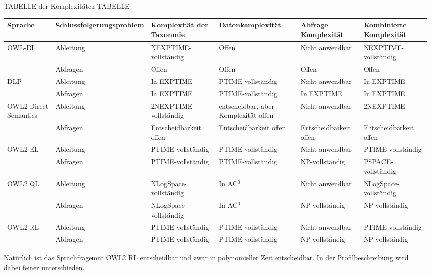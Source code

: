 TABELLE der Komplexitäten TABELLE
\begin{table}
	
	\begin{tabular}{|m{1.4cm}|p{2cm}|p{2cm}|p{2cm}|p{2cm}|p{2cm}|}
	\hline
	Sprache & Schlussfolger\-ungs\-problem & Komplexität der Taxonmie & Daten\-komplexität & Abfrage Komplexität & Kombinierte Komplexität \\
	\hline
	\hline
	\multirow{2}{*}{OWL-DL} & Ableitung & NEXPTIME-vollständig & Offen & Nicht anwendbar & NEXPTIME-vollständig \\ \cline{2-6}
		& Abfragen & Offen & Offen & Offen & Offen \\
	\hline
	\multirow{2}{*}{DLP} & Ableitung & In EXPTIME & PTIME-vollständig & Nicht anwendbar & In EXPTIME \\ \cline{2-6}
		& Abfragen & In EXPTIME & PTIME-vollständig & In EXPTIME & In EXPTIME \\
	\hline
	\multirow{2}{*}{OWL2 Direct Semantics} & Ableitung & 2NEXPTIME-vollständig & entscheidbar, aber Komplexität offen & Nicht anwendbar & 2NEXPTIME \\ \cline{2-6}
		& Abfragen & Entscheidbarkeit offen & Entscheidbarkeit offen & Entscheidbarkeit offen & Entscheidbarkeit offen \\
	\hline
	\multirow{2}{*}{OWL2 EL} & Ableitung & PTIME-vollständig & PTIME-vollständig & Nicht anwendbar & PTIME-vollständig \\ \cline{2-6}
		& Abfragen & PTIME-vollständig & PTIME-vollständig & NP-vollständig & PSPACE-vollständig \\
	\hline
	\multirow{2}{*}{OWL2 QL} & Ableitung & NLogSpace-vollständig & In AC$^0$ & Nicht anwendbar & NLogSpace-vollständig \\ \cline{2-6}
		& Abfragen & NLogSpace-vollständig & In AC$^0$ & NP-vollständig & NP-vollständig \\
	\hline
	\multirow{2}{*}{OWL2 RL} & Ableitung & PTIME-vollständig & PTIME-vollständig & Nicht anwendbar & PTIME-vollständig \\ \cline{2-6}
		& Abfragen & PTIME-vollständig & PTIME-vollständig & NP-vollständig & NP-vollständig \\
	\hline
	\end{tabular}
	
	\cite{WebontTractable}
	\cite{OWL2Complexities}
	\cite{ComplexityNavigator}
\end{table}

Natürlich ist das Sprachfragemnt OWL2 RL entscheidbar und zwar in polynomieller Zeit entscheidbar. In der Profilbeschreibung wird dabei feiner unterschieden.

